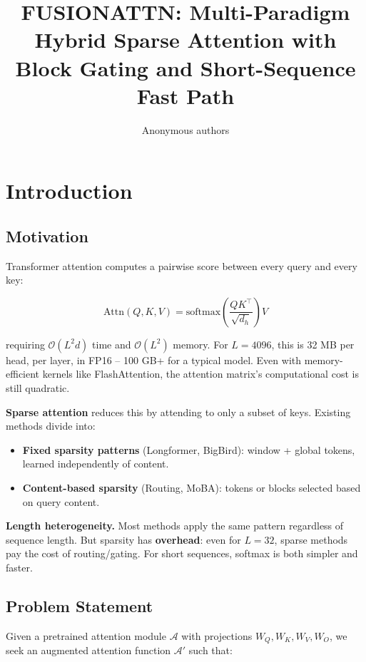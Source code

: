 \title{\textbf{FUSIONATTN: Multi-Paradigm Hybrid Sparse Attention with Block Gating and Short-Sequence Fast Path}}

\author{Anonymous authors}


\section{Introduction}

\subsection{Motivation}

Transformer attention computes a pairwise score between every query and 
every key:

\[
\text{Attn}(Q, K, V) = \text{softmax}\!\left(\frac{Q K^\top}{\sqrt{d_h}}\right) V
\tag{1.1}
\]

requiring $\mathcal{O}(L^2 d)$ time and $\mathcal{O}(L^2)$ memory. For 
$L = 4096$, this is 32 MB per head, per layer, in FP16 -- 100 GB+ for a 
typical model. Even with memory-efficient kernels like FlashAttention, the 
attention matrix's computational cost is still quadratic.

\textbf{Sparse attention} reduces this by attending to only a subset of keys. 
Existing methods divide into:

\begin{itemize}
\item \textbf{Fixed sparsity patterns} (Longformer, BigBird): window + global tokens,
  learned independently of content.
\item \textbf{Content-based sparsity} (Routing, MoBA): tokens or blocks selected
  based on query content.

\end{itemize}
\textbf{Length heterogeneity.} Most methods apply the same pattern regardless of 
sequence length. But sparsity has \textbf{overhead}: even for $L = 32$, sparse 
methods pay the cost of routing/gating. For short sequences, softmax is 
both simpler and faster.

\subsection{Problem Statement}

Given a pretrained attention module $\mathcal{A}$ with projections 
$W_Q, W_K, W_V, W_O$, we seek an augmented attention function 
$\mathcal{A}'$ such that:

